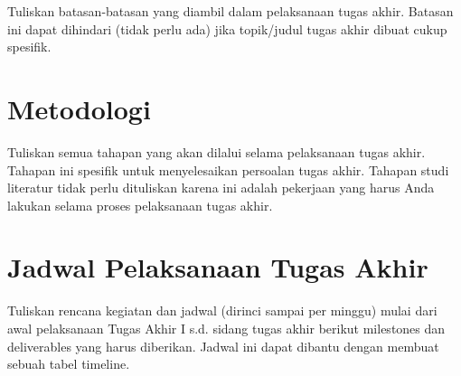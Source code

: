 Tuliskan batasan-batasan yang diambil dalam pelaksanaan tugas akhir. Batasan ini dapat dihindari (tidak perlu ada) jika topik/judul tugas akhir dibuat cukup spesifik.

\section{Metodologi}

Tuliskan semua tahapan yang akan dilalui selama pelaksanaan tugas akhir. Tahapan ini spesifik untuk menyelesaikan persoalan tugas akhir. Tahapan studi literatur tidak perlu dituliskan karena ini adalah pekerjaan yang harus Anda lakukan selama proses pelaksanaan tugas akhir.

\section{Jadwal Pelaksanaan Tugas Akhir}

Tuliskan rencana kegiatan dan jadwal (dirinci sampai per minggu) mulai dari awal pelaksanaan Tugas Akhir I s.d. sidang tugas akhir berikut milestones dan deliverables yang harus diberikan. Jadwal ini dapat dibantu dengan membuat sebuah tabel timeline.
